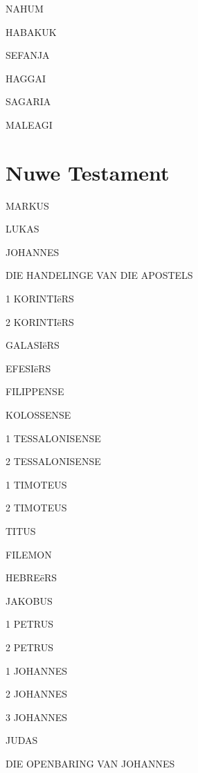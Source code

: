 \documentclass[twoside,twocolumn,letterpaper]{book}
\newcommand{\jnumChapters}{0}
\begin{document}
NAHUM

HABAKUK

SEFANJA

HAGGAI

SAGARIA

MALEAGI





\part*{Nuwe Testament}
\setlength{\columnseprule}{0.0pt}
\renewcommand{\jnumChapters}{0}



MARKUS

LUKAS

JOHANNES

DIE HANDELINGE VAN DIE APOSTELS











1 KORINTIëRS

2 KORINTIëRS

GALASIëRS

EFESIëRS

FILIPPENSE

KOLOSSENSE

1 TESSALONISENSE

2 TESSALONISENSE

1 TIMOTEUS

2 TIMOTEUS

TITUS

FILEMON

HEBREëRS

JAKOBUS

1 PETRUS

2 PETRUS

1 JOHANNES

2 JOHANNES

3 JOHANNES

JUDAS

DIE OPENBARING VAN JOHANNES
\end{document}
